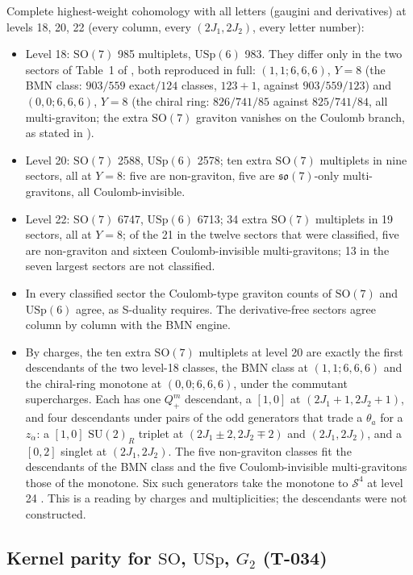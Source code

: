 \documentclass[11pt]{article}
\newcommand{\T}[1]{\textsf{T-0#1}}
\newcommand{\SU}{\mathrm{SU}}
\newcommand{\SO}{\mathrm{SO}}
\newcommand{\USp}{\mathrm{USp}}
\newcommand{\Gtwo}{G_2}
\begin{document}
Complete highest-weight cohomology with all letters (gaugini and derivatives) at levels 18, 20, 22 (every column,
every $(2J_1,2J_2)$, every letter number):
\begin{itemize}
\item Level 18: $\SO(7)$ 985 multiplets, $\USp(6)$ 983. They differ only in the two sectors of Table~1 of
\cite{CLSduality}, both reproduced in full: $(1,1;6,6,6)$, $Y=8$ (the BMN class: $903/559$ exact$/124$ classes,
$123+1$, against $903/559/123$) and $(0,0;6,6,6)$, $Y=8$ (the chiral ring: $826/741/85$ against $825/741/84$, all
multi-graviton; the extra $\SO(7)$ graviton vanishes on the Coulomb branch, as stated in \cite{CLSduality}).
\item Level 20: $\SO(7)$ 2588, $\USp(6)$ 2578; ten extra $\SO(7)$ multiplets in nine sectors, all at $Y=8$: five are
non-graviton, five are $\mathfrak{so}(7)$-only multi-gravitons, all Coulomb-invisible.
\item Level 22: $\SO(7)$ 6747, $\USp(6)$ 6713; 34 extra $\SO(7)$ multiplets in 19 sectors, all at $Y=8$; of the 21 in
the twelve sectors that were classified, five are non-graviton and sixteen Coulomb-invisible multi-gravitons; 13 in the
seven largest sectors are not classified.
\item In every classified sector the Coulomb-type graviton counts of $\SO(7)$ and $\USp(6)$ agree, as S-duality
requires. The derivative-free sectors agree column by column with the BMN engine.
\item By charges, the ten extra $\SO(7)$ multiplets at level 20 are exactly the first descendants of the two level-18
classes, the BMN class at $(1,1;6,6,6)$ and the chiral-ring monotone at $(0,0;6,6,6)$, under the commutant
supercharges. Each has one $Q^m_+$ descendant, a $[1,0]$ at $(2J_1+1,2J_2+1)$, and four descendants under pairs of the
odd generators that trade a $\theta_a$ for a $z_{\dot\alpha}$: a $[1,0]$ $\SU(2)_R$ triplet at $(2J_1\pm2,2J_2\mp2)$
and $(2J_1,2J_2)$, and a $[0,2]$ singlet at $(2J_1,2J_2)$. The five non-graviton classes fit the descendants of the BMN
class and the five Coulomb-invisible multi-gravitons those of the monotone. Six such generators take the monotone to
$\mathcal S^4$ at level 24 \cite[eq.~(5.4)]{KVM}. This is a reading by charges and multiplicities; the descendants were not
constructed.
\end{itemize}

\subsection{Kernel parity for $\SO$, $\USp$, $\Gtwo$ (\T{34})}
\end{document}
